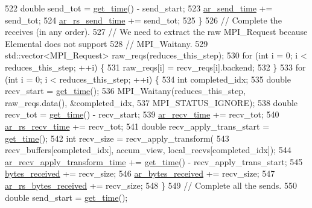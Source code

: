 \begin{DoxyCode}
522       \textcolor{keywordtype}{double} send\_tot = \hyperlink{namespacelbann_a478d36031ff0659893c4322cd856157f}{get\_time}() - send\_start;
523       \hyperlink{classlbann_1_1lbann__comm_a60a664f47efb52d9936b72d34059d1ef}{ar\_send\_time} += send\_tot;
524       \hyperlink{classlbann_1_1lbann__comm_aaadab22d368e8004a9877828a3bc9e93}{ar\_rs\_send\_time} += send\_tot;
525     \}
526     \textcolor{comment}{// Complete the receives (in any order).}
527     \textcolor{comment}{// We need to extract the raw MPI\_Request because Elemental does not support}
528     \textcolor{comment}{// MPI\_Waitany.}
529     std::vector<MPI\_Request> raw\_reqs(reduces\_this\_step);
530     \textcolor{keywordflow}{for} (\textcolor{keywordtype}{int} i = 0; i < reduces\_this\_step; ++i) \{
531       raw\_reqs[i] = recv\_reqs[i].backend;
532     \}
533     \textcolor{keywordflow}{for} (\textcolor{keywordtype}{int} i = 0; i < reduces\_this\_step; ++i) \{
534       \textcolor{keywordtype}{int} completed\_idx;
535       \textcolor{keywordtype}{double} recv\_start = \hyperlink{namespacelbann_a478d36031ff0659893c4322cd856157f}{get\_time}();
536       MPI\_Waitany(reduces\_this\_step, raw\_reqs.data(), &completed\_idx,
537                   MPI\_STATUS\_IGNORE);
538       \textcolor{keywordtype}{double} recv\_tot = \hyperlink{namespacelbann_a478d36031ff0659893c4322cd856157f}{get\_time}() - recv\_start;
539       \hyperlink{classlbann_1_1lbann__comm_a4c9323938961c3524dc67f4b7b47e3ae}{ar\_recv\_time} += recv\_tot;
540       \hyperlink{classlbann_1_1lbann__comm_adefa0ee8b0a6b74072448e20d40f502d}{ar\_rs\_recv\_time} += recv\_tot;
541       \textcolor{keywordtype}{double} recv\_apply\_trans\_start = \hyperlink{namespacelbann_a478d36031ff0659893c4322cd856157f}{get\_time}();
542       \textcolor{keywordtype}{int} recv\_size = recv\_apply\_transform(
543                         recv\_buffers[completed\_idx], accum\_view, local\_recvs[completed\_idx]);
544       \hyperlink{classlbann_1_1lbann__comm_aa642b0ae2321fa464b0092da527f6375}{ar\_recv\_apply\_transform\_time} += \hyperlink{namespacelbann_a478d36031ff0659893c4322cd856157f}{get\_time}() - 
      recv\_apply\_trans\_start;
545       \hyperlink{classlbann_1_1lbann__comm_afb99f57f7eafc0695bf28e6c26a8120f}{bytes\_received} += recv\_size;
546       \hyperlink{classlbann_1_1lbann__comm_aa5f3c53358bf9002b9fab41918b0c8c1}{ar\_bytes\_received} += recv\_size;
547       \hyperlink{classlbann_1_1lbann__comm_a2c3e1db0f6d2345748132322b0555db7}{ar\_rs\_bytes\_received} += recv\_size;
548     \}
549     \textcolor{comment}{// Complete all the sends.}
550     \textcolor{keywordtype}{double} send\_start = \hyperlink{namespacelbann_a478d36031ff0659893c4322cd856157f}{get\_time}();

\end{DoxyCode}
